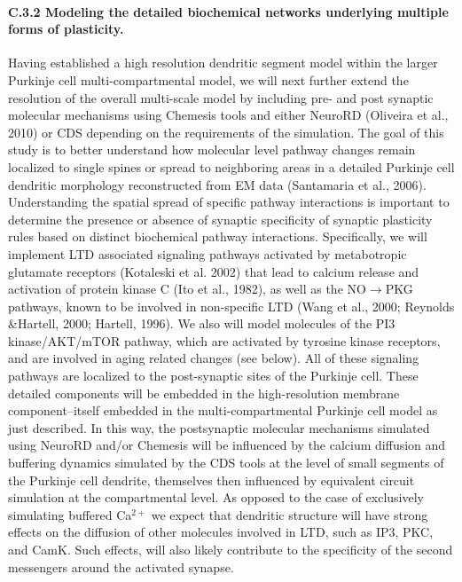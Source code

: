 \documentclass[12pt]{article}
\begin{document}
\paragraph{C.3.2 Modeling the detailed biochemical networks underlying multiple forms of plasticity.} Having established a high resolution dendritic segment model within the larger Purkinje cell multi-compartmental model, we will next further extend the resolution of the overall multi-scale model by including pre- and post synaptic molecular mechanisms using Chemesis tools and either NeuroRD (Oliveira et al., 2010) or CDS depending on the requirements of the simulation. The goal of this study is to better understand how molecular level pathway changes remain localized to single spines or spread to neighboring areas in a detailed Purkinje cell dendritic morphology reconstructed from EM data (Santamaria et al., 2006). Understanding the spatial spread of specific pathway interactions is important to determine the presence or absence of synaptic specificity of synaptic plasticity rules based on distinct biochemical pathway interactions. Specifically, we will implement LTD associated signaling pathways activated by metabotropic glutamate receptors (Kotaleski et al. 2002) that lead to calcium release and activation of protein kinase C (Ito et al., 1982), as well as the NO$\rightarrow$PKG pathways, known to be involved in non-specific LTD (Wang et al., 2000; Reynolds \&Hartell, 2000; Hartell, 1996). We also will model molecules of the PI3 kinase/AKT/mTOR pathway, which are activated by tyrosine kinase receptors, and are involved in aging related changes (see below). All of these signaling pathways are localized to the post-synaptic sites of the Purkinje cell. These detailed components will be embedded in the high-resolution membrane component--itself embedded in the multi-compartmental Purkinje cell model as just described. In this way, the postsynaptic molecular mechanisms simulated using NeuroRD and/or Chemesis will be influenced by the calcium diffusion and buffering dynamics simulated by the CDS tools at the level of small segments of the Purkinje cell dendrite, themselves then influenced by equivalent circuit simulation at the compartmental level. As opposed to the case of exclusively simulating buffered Ca$^{2+}$ we expect that dendritic structure will have strong effects on the diffusion of other molecules involved in LTD, such as IP3, PKC, and CamK. Such effects, will also likely contribute to the specificity of the second messengers around the activated synapse.
\end{document}
